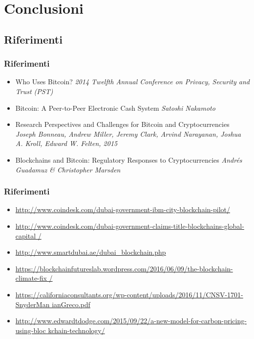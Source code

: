 \section*{Conclusioni}
\subsection*{Riferimenti}
\begin{frame}
  \frametitle{Riferimenti}

  \begin{itemize}
   \item Who Uses Bitcoin? \emph{2014 Twelfth Annual Conference on Privacy, 
Security and Trust (PST)}
   \item Bitcoin: A Peer-to-Peer Electronic Cash System \emph{Satoshi Nakamoto}
   \item Research Perspectives and Challenges for Bitcoin and Cryptocurrencies 
\emph{Joseph Bonneau, Andrew Miller, Jeremy Clark, Arvind Narayanan, Joshua A. 
Kroll, Edward W. Felten, 2015}
   \item Blockchains and Bitcoin: Regulatory Responses to Cryptocurrencies 
\emph{Andrés Guadamuz \& Christopher Marsden}
  \end{itemize}

\end{frame}


\begin{frame}
  \frametitle{Riferimenti}

  \begin{itemize}
   \item
\url{http://www.coindesk.com/dubai-government-ibm-city-blockchain-pilot/}
\item
\url{
http://www.coindesk.com/dubai-government-claims-title-blockchains-global-capital
/}
\item \url{http://www.smartdubai.ae/dubai_blockchain.php}
\item
\url{
https://blockchainfutureslab.wordpress.com/2016/06/09/the-blockchain-climate-fix
/}
\item
\url{
https://californiaconsultants.org/wp-content/uploads/2016/11/CNSV-1701-SnyderMan
ianGreco.pdf}
\item
\url{
http://www.edwardtdodge.com/2015/09/22/a-new-model-for-carbon-pricing-using-bloc
kchain-technology/}
  \end{itemize}

\end{frame}
